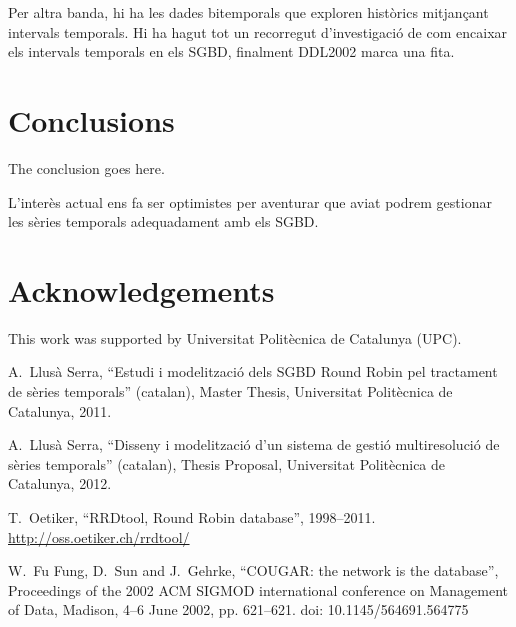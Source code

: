 \documentclass[
english
]{scrartcl}
\begin{document}





Per altra banda, hi ha les dades bitemporals que exploren històrics mitjançant intervals temporals. Hi ha hagut tot un recorregut d'investigació de com encaixar  els intervals temporals en els SGBD, finalment DDL2002 marca una fita.



\section{Conclusions} 
The conclusion goes here.

L'interès actual ens fa ser optimistes per aventurar que aviat podrem gestionar les sèries temporals adequadament amb els SGBD.



\section*{Acknowledgements}

This work was supported by Universitat Polit\`{e}cnica de Catalunya (UPC).



\begin{thebibliography}{9}


 A.\ Llusà Serra, ``Estudi i modelització
  dels SGBD Round Robin pel tractament de sèries temporals''
  (catalan), Master Thesis, Universitat Politècnica de Catalunya,
  2011. 

 A.\ Llusà Serra, ``Disseny i modelització
  d'un sistema de gestió multiresolució de sèries temporals''
  (catalan), Thesis Proposal, Universitat Politècnica de Catalunya,
  2012. 


 T.\ Oetiker, ``RRDtool, Round Robin database'',
  1998--2011.  \url{http://oss.oetiker.ch/rrdtool/}


 W.\ Fu Fung, D.\ Sun and J.\ Gehrke, ``COUGAR: the network is the database'', Proceedings of the 2002 ACM SIGMOD international conference on Management of Data, Madison, 4--6 June 2002, pp. 621--621. doi: 10.1145/564691.564775 



\end{thebibliography}
\end{document}
